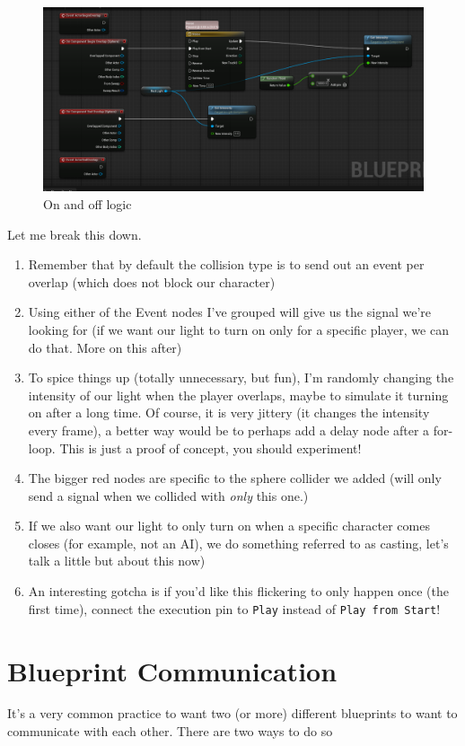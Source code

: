 \documentclass[]{article}
\begin{document}
	
	\begin{figure}[h]
		\centering
		\includegraphics[width=1\linewidth]{day4images/screenshot016}
		\caption{On and off logic}
		\label{fig:screenshot016}
	\end{figure}
	\newpage
	Let me break this down.
	\begin{enumerate}
		\item Remember that by default the collision type is to send out an event per overlap (which does not block our character)
		\item Using either of the Event nodes I've grouped will give us the signal we're looking for (if we want our light to turn on only for a specific player, we can do that. More on this after)
		\item To spice things up (totally unnecessary, but fun), I'm randomly changing the intensity of our light when the player overlaps, maybe to simulate it turning on after a long time. Of course, it is very jittery (it changes the intensity every frame), a better way would be to perhaps add a delay node after a for-loop. This is just a proof of concept, you should experiment!
		\item The bigger red nodes are specific to the sphere collider we added (will only send a signal when we collided with \emph{only} this one.)
		\item If we also want our light to only turn on when a specific character comes closes (for example, not an AI), we do something referred to as casting, let's talk a little but about this now)
		\item An interesting gotcha is if you'd like this flickering to only happen once (the first time), connect the execution pin to \verb*|Play| instead of \verb|Play from Start|!
	\end{enumerate}
	
	\section{Blueprint Communication}
	It's a very common practice to want two (or more) different blueprints to want to communicate with each other. There are two ways to do so
	
\end{document}
